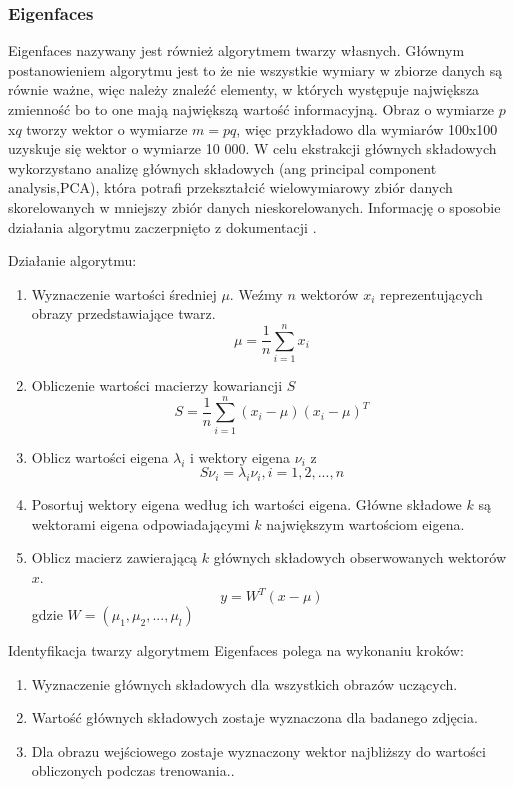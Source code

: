 \subsubsection{Eigenfaces} \label{eigen}
Eigenfaces nazywany jest również algorytmem twarzy własnych. Głównym postanowieniem algorytmu jest to że nie wszystkie wymiary w zbiorze danych są równie ważne, więc należy znaleźć elementy, w których występuje największa zmienność bo to one mają największą wartość informacyjną. Obraz o wymiarze $p$x$q$ tworzy wektor o wymiarze $m=pq$, więc przykładowo dla wymiarów 100x100 uzyskuje się wektor o wymiarze 10 000. W celu ekstrakcji głównych składowych wykorzystano analizę głównych składowych (ang principal component analysis,PCA), która potrafi przekształcić wielowymiarowy zbiór danych skorelowanych w mniejszy zbiór danych nieskorelowanych. Informację o sposobie działania algorytmu zaczerpnięto z dokumentacji \cite{opencv_doc}.

Działanie algorytmu:
\begin{enumerate}
\item Wyznaczenie wartości średniej $\mu$. Weźmy $n$ wektorów $x_{i}$ reprezentujących obrazy przedstawiające twarz.
\begin{equation}
\mu=\frac{1}{n}\sum_{i=1}^{n}x_{i}
\end{equation}
\item Obliczenie wartości macierzy kowariancji $S$
\begin{equation}
S=\frac{1}{n}\sum^{n}_{i=1}(x_{i}-\mu)(x_{i}-\mu)^{T}
\end{equation}
\item Oblicz wartości eigena $\lambda_{i}$ i wektory eigena $\nu_{i}$ z \begin{equation}
S\nu_{i}=\lambda_{i}\nu_{i},i=1,2,...,n
\end{equation}
\item Posortuj wektory eigena według ich wartości eigena. Główne składowe $k$ są wektorami eigena odpowiadającymi $k$ największym wartościom eigena.
\item Oblicz macierz zawierającą $k$ głównych składowych obserwowanych wektorów $x$.
\begin{equation}
y=W^{T}(x-\mu)
\end{equation}
gdzie $W=(\mu_{1},\mu_{2},...,\mu_{l})$
\end{enumerate}

Identyfikacja twarzy algorytmem Eigenfaces polega na wykonaniu kroków:
\begin{enumerate}
\item Wyznaczenie głównych składowych dla wszystkich obrazów uczących.
\item Wartość głównych składowych zostaje wyznaczona dla badanego zdjęcia.
\item Dla obrazu wejściowego zostaje wyznaczony wektor najbliższy do wartości obliczonych podczas trenowania..
\end{enumerate}

